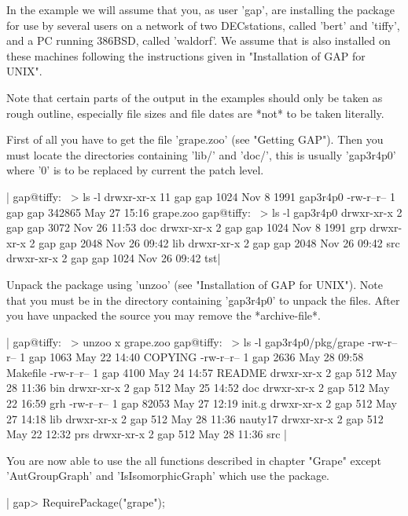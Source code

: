 In the example we will assume that you, as user 'gap', are installing the
{\GRAPE}  package  for  use  by  several  users  on  a  network   of  two
DECstations, called  'bert' and 'tiffy',  and a PC running 386BSD, called
'waldorf'.  We assume that {\GAP}  is  also  installed on  these machines
following the instructions given in "Installation of GAP for UNIX".

Note that certain parts  of  the  output  in the examples should  only be
taken as rough outline, especially file sizes and file dates are *not* to
be taken literally.

First of  all you have to get  the file  'grape.zoo' (see "Getting GAP").
Then you must locate the {\GAP} directories containing 'lib/' and 'doc/',
this is usually  'gap3r4p0' where '0' is to   be replaced by  current the
patch level.

|    gap@tiffy:~ > ls -l
    drwxr-xr-x  11 gap      gap          1024 Nov  8  1991 gap3r4p0
    -rw-r--r--   1 gap      gap        342865 May 27 15:16 grape.zoo
    gap@tiffy:~ > ls -l gap3r4p0
    drwxr-xr-x   2 gap      gap          3072 Nov 26 11:53 doc
    drwxr-xr-x   2 gap      gap          1024 Nov  8  1991 grp
    drwxr-xr-x   2 gap      gap          2048 Nov 26 09:42 lib
    drwxr-xr-x   2 gap      gap          2048 Nov 26 09:42 src
    drwxr-xr-x   2 gap      gap          1024 Nov 26 09:42 tst|

Unpack the  package using 'unzoo'  (see "Installation  of GAP for UNIX").
Note that you must  be in the directory  containing 'gap3r4p0'  to unpack
the files.   After   you have unpacked  the  source  you may   remove the
*archive-file*.

|    gap@tiffy:~ > unzoo x grape.zoo
    gap@tiffy:~ > ls -l gap3r4p0/pkg/grape
    -rw-r--r--    1 gap   1063 May 22 14:40 COPYING
    -rw-r--r--    1 gap   2636 May 28 09:58 Makefile
    -rw-r--r--    1 gap   4100 May 24 14:57 README
    drwxr-xr-x    2 gap    512 May 28 11:36 bin
    drwxr-xr-x    2 gap    512 May 25 14:52 doc
    drwxr-xr-x    2 gap    512 May 22 16:59 grh
    -rw-r--r--    1 gap  82053 May 27 12:19 init.g
    drwxr-xr-x    2 gap    512 May 27 14:18 lib
    drwxr-xr-x    2 gap    512 May 28 11:36 nauty17
    drwxr-xr-x    2 gap    512 May 22 12:32 prs
    drwxr-xr-x    2 gap    512 May 28 11:36 src |

You are now able  to use the  all functions described in  chapter "Grape"
except 'AutGroupGraph' and  'IsIsomorphicGraph'  which use the   {\nauty}
package.

|    gap> RequirePackage("grape");

